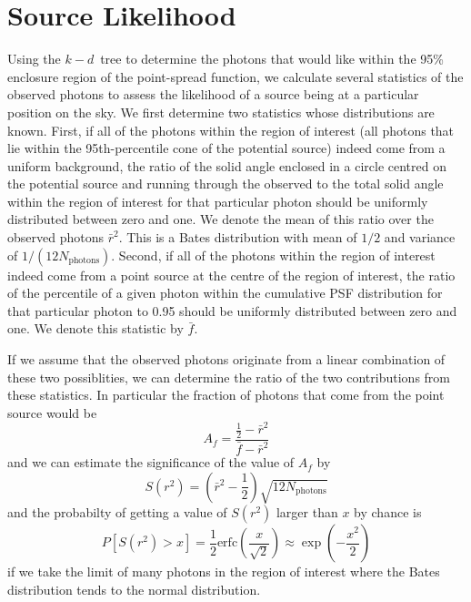 \documentclass[useAMS,usenatbib]{mn2e}
\begin{document}
\section{Source Likelihood}

Using the $k-d$~tree to determine the photons that would like within
the 95\% enclosure region of the point-spread function, we calculate
several statistics of the observed photons to assess the likelihood of
a source being at a particular position on the sky.  We first
determine two statistics whose distributions are known. First, if all
of the photons within the region of interest (all photons that lie
within the 95th-percentile cone of the potential source) indeed come
from a uniform background, the ratio of the solid angle enclosed in a
circle centred on the potential source and running through the
observed to the total solid angle within the region of interest for
that particular photon should be uniformly distributed between zero
and one.  We denote the mean of this ratio over the observed photons
$\bar r^2$.  This is a Bates distribution with mean of $1/2$ and
variance of $1/(12 N_\mathrm{photons})$.  Second, if all of the photons within the
region of interest indeed come from a point source at the centre of
the region of interest, the ratio of the percentile of a given photon
within the cumulative PSF distribution for that particular photon to
0.95 should be uniformly distributed between zero and one.  We denote
this statistic by $\bar f$.

If we assume that the observed photons originate from a linear
combination of these two possiblities, we can determine the ratio of
the two contributions from these statistics. In particular the fraction
of photons that come from the point source would be
\begin{equation}
  A_f=\frac{\frac{1}{2}-\bar r^2}{\bar f-\bar r^2}
  \label{eq:1}
\end{equation}
and we can estimate the significance of the value of $A_f$ by
\begin{equation}
  S(r^2) = \left ( \bar r^2-\frac{1}{2} \right ) \sqrt{12 N_\mathrm{photons}}
\end{equation}
and the probabilty of getting a value of $S(r^2)$ larger than $x$ by
chance is
\begin{equation}
  P\left [ S(r^2) > x \right ] = \frac{1}{2} \mathrm{erfc} \left ( \frac{x}{\sqrt{2}} \right
    ) \approx \exp \left (-\frac{x^2}{2} \right )
\end{equation}
if we take the limit of many photons in the region of interest where
the Bates distribution tends to the normal distribution.  
\end{document}

